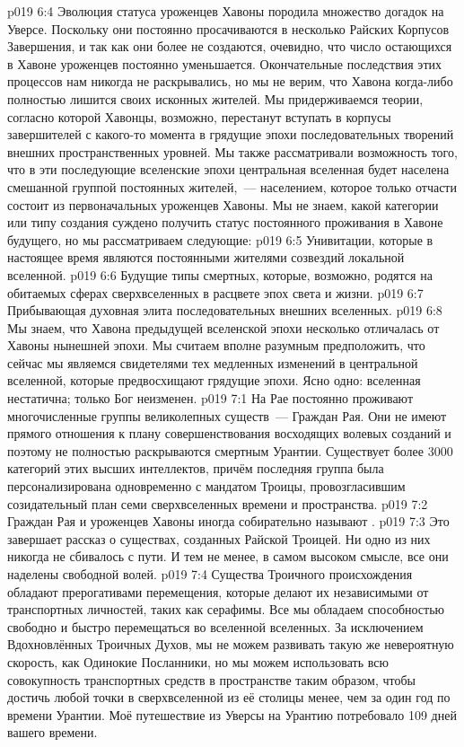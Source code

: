 \vs p019 6:4 \pc Эволюция статуса уроженцев Хавоны породила множество догадок на Уверсе. Поскольку они постоянно просачиваются в несколько Райских Корпусов Завершения, и так как они более не создаются, очевидно, что число остающихся в Хавоне уроженцев постоянно уменьшается. Окончательные последствия этих процессов нам никогда не раскрывались, но мы не верим, что Хавона когда\hyp{}либо полностью лишится своих исконных жителей. Мы придерживаемся теории, согласно которой Хавонцы, возможно, перестанут вступать в корпусы завершителей с какого\hyp{}то момента в грядущие эпохи последовательных творений внешних пространственных уровней. Мы также рассматривали возможность того, что в эти последующие вселенские эпохи центральная вселенная будет населена смешанной группой постоянных жителей,~--- населением, которое только отчасти состоит из первоначальных уроженцев Хавоны. Мы не знаем, какой категории или типу создания суждено получить статус постоянного проживания в Хавоне будущего, но мы рассматриваем следующие:
\vs p019 6:5 Унивитации, которые в настоящее время являются постоянными жителями созвездий локальной вселенной.
\vs p019 6:6 Будущие типы смертных, которые, возможно, родятся на обитаемых сферах сверхвселенных в расцвете эпох света и жизни.
\vs p019 6:7 Прибывающая духовная элита последовательных внешних вселенных.
\vs p019 6:8 Мы знаем, что Хавона предыдущей вселенской эпохи несколько отличалась от Хавоны нынешней эпохи. Мы считаем вполне разумным предположить, что сейчас мы являемся свидетелями тех медленных изменений в центральной вселенной, которые предвосхищают грядущие эпохи. Ясно одно: вселенная нестатична; только Бог неизменен.
\vs p019 7:1 На Рае постоянно проживают многочисленные группы великолепных существ~--- Граждан Рая. Они не имеют прямого отношения к плану совершенствования восходящих волевых созданий и поэтому не полностью раскрываются смертным Урантии. Существует более 3000 категорий этих высших интеллектов, причём последняя группа была персонализирована одновременно с мандатом Троицы, провозгласившим созидательный план семи сверхвселенных времени и пространства.
\vs p019 7:2 \pc Граждан Рая и уроженцев Хавоны иногда собирательно называют .
\vs p019 7:3 \pc Это завершает рассказ о существах, созданных Райской Троицей. Ни одно из них никогда не сбивалось с пути. И тем не менее, в самом высоком смысле, все они наделены свободной волей.
\vs p019 7:4 Существа Троичного происхождения обладают прерогативами перемещения, которые делают их независимыми от транспортных личностей, таких как серафимы. Все мы обладаем способностью свободно и быстро перемещаться во вселенной вселенных. За исключением Вдохновлённых Троичных Духов, мы не можем развивать такую же невероятную скорость, как Одинокие Посланники, но мы можем использовать всю совокупность транспортных средств в пространстве таким образом, чтобы достичь любой точки в сверхвселенной из её столицы менее, чем за один год по времени Урантии. Моё путешествие из Уверсы на Урантию потребовало 109 дней вашего времени.
